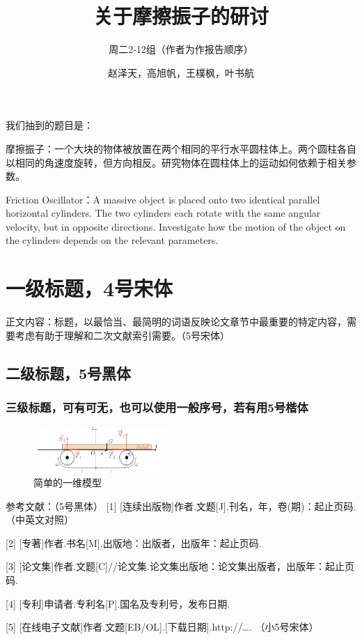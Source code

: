 \documentclass[UTF8,a4paper,12pt,twocolumn]{ctexart}
\title{关于摩擦振子的研讨}
\author{赵泽天，高旭帆，王樸枫，叶书航}
\subtitle{周二2-12组（作者为作报告顺序）}
\date{}
\begin{document}
\maketitle

\wuhao\linespread{0.8}
我们抽到的题目是：

\vspace{0.5em}
\noindent\begin{tcolorbox}
\fangsong
摩擦振子：一个大块的物体被放置在两个相同的平行水平圆柱体上。两个圆柱各自以相同的角速度旋转，但方向相反。研究物体在圆柱体上的运动如何依赖于相关参数。

Friction Oscillator：A massive object is placed onto two identical parallel horizontal cylinders. The two cylinders each rotate with the same angular velocity, but in opposite directions. Investigate how the motion of the object on the cylinders depends on the relevant parameters.
\end{tcolorbox}
\songti

\section{一级标题，4号宋体}
正文内容：标题，以最恰当、最简明的词语反映论文章节中最重要的特定内容，需要考虑有助于理解和二次文献索引需要。（5号宋体）

\subsection{二级标题，5号黑体}

\subsubsection{三级标题，可有可无，也可以使用一般序号，若有用5号楷体}
\begin{figure}[!h]
	\centering
	\includegraphics[width=0.45\textwidth]{1d_model.png}
	\caption{简单的一维模型}\label{fig:1d_model}
\end{figure}



\begin{thebibliography}{100}
	\xiaowu\songti
		参考文献：（5号黑体）
	[1] [连续出版物]作者.文题[J].刊名，年，卷(期)：起止页码.（中英文对照）
	
	[2] [专著]作者.书名[M].出版地：出版者，出版年：起止页码.
	
	[3] [论文集]作者.文题[C]//论文集.论文集出版地：论文集出版者，出版年：起止页码.
	
	[4] [专利]申请者.专利名[P].国名及专利号，发布日期.
	
	[5] [在线电子文献]作者.文题[EB/OL].[下载日期].http://…. （小5号宋体）
\end{thebibliography}
%
%
\end{document}
